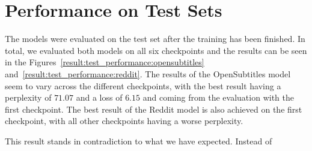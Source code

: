 \section{Performance on Test Sets}
The models were evaluated on the test set after the training has been finished. In total, we evaluated both models on all six checkpoints and the results can be seen in the Figures~\ref{result:test_performance:opensubtitles} and~\ref{result:test_performance:reddit}. The results of the OpenSubtitles model seem to vary across the different checkpoints, with the best result having a perplexity of $71.07$ and a loss of $6.15$ and coming from the evaluation with the first checkpoint. The best result of the Reddit model is also achieved on the first checkpoint, with all other checkpoints having a worse perplexity.

This result stands in contradiction to what we have expected. Instead of 

